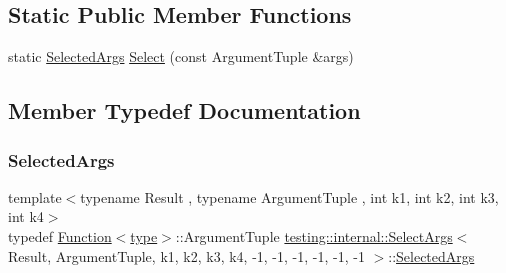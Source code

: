 \subsection*{Static Public Member Functions}
\begin{DoxyCompactItemize}
\item 
static \mbox{\hyperlink{classtesting_1_1internal_1_1_select_args_3_01_result_00_01_argument_tuple_00_01k1_00_01k2_00_01k7cadbb88f40ff7408f8c070bb61c70db_a43b23530d7b427507a4905800f01548b}{Selected\+Args}} \mbox{\hyperlink{classtesting_1_1internal_1_1_select_args_3_01_result_00_01_argument_tuple_00_01k1_00_01k2_00_01k7cadbb88f40ff7408f8c070bb61c70db_ad5abffa0598dcd102f890549be5ee292}{Select}} (const Argument\+Tuple \&args)
\end{DoxyCompactItemize}


\subsection{Member Typedef Documentation}
\mbox{\label{classtesting_1_1internal_1_1_select_args_3_01_result_00_01_argument_tuple_00_01k1_00_01k2_00_01k7cadbb88f40ff7408f8c070bb61c70db_a43b23530d7b427507a4905800f01548b}} 
\subsubsection{\texorpdfstring{SelectedArgs}{SelectedArgs}}
{\footnotesize\ttfamily template$<$typename Result , typename Argument\+Tuple , int k1, int k2, int k3, int k4$>$ \\
typedef \mbox{\hyperlink{structtesting_1_1internal_1_1_function}{Function}}$<$\mbox{\hyperlink{classtesting_1_1internal_1_1_select_args_3_01_result_00_01_argument_tuple_00_01k1_00_01k2_00_01k7cadbb88f40ff7408f8c070bb61c70db_a9c0ad299bbbc5468d4c3dc396f337bf5}{type}}$>$\+::Argument\+Tuple \mbox{\hyperlink{classtesting_1_1internal_1_1_select_args}{testing\+::internal\+::\+Select\+Args}}$<$ Result, Argument\+Tuple, k1, k2, k3, k4, -\/1, -\/1, -\/1, -\/1, -\/1, -\/1 $>$\+::\mbox{\hyperlink{classtesting_1_1internal_1_1_select_args_3_01_result_00_01_argument_tuple_00_01k1_00_01k2_00_01k7cadbb88f40ff7408f8c070bb61c70db_a43b23530d7b427507a4905800f01548b}{Selected\+Args}}}

